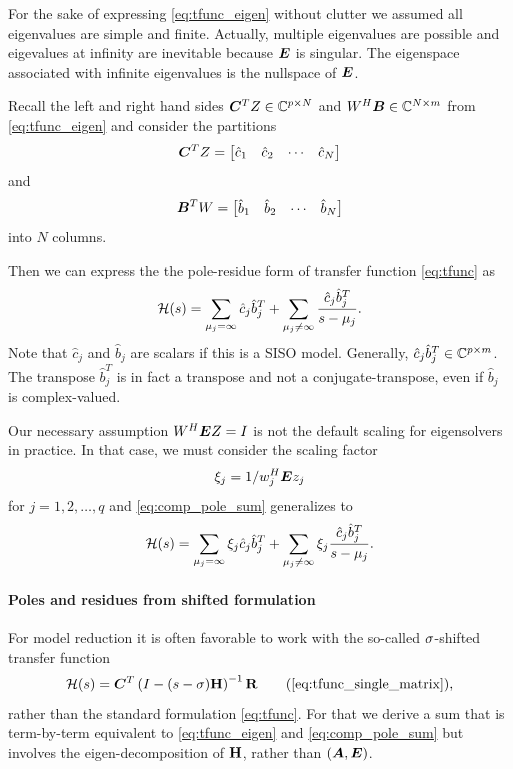 \bigskip 
For the sake of expressing \eqref{eq:tfunc_eigen} without clutter we assumed all eigenvalues are simple and finite.  Actually, multiple eigenvalues are possible and eigevalues at infinity are inevitable because $\bm{E}$ is singular.  The eigenspace associated with infinite eigenvalues is the nullspace of $\bm{E}$. 

Recall the left and right hand sides $\bm{C}^T Z\in \mathbb{C}^{p \times N}$ and $W^H \bm{B}\in \mathbb{C}^{N\times m}$ from \eqref{eq:tfunc_eigen} and consider the partitions 
\[
\bm{C}^T Z = \begin{bmatrix} \hat{c}_1 & \hat{c}_2 &\cdots&\hat{c}_N\end{bmatrix}
\]
and 
\[
\bm{B}^T W = \begin{bmatrix} \hat{b}_1 & \hat{b}_2 &\cdots&\hat{b}_N\end{bmatrix}
\]
into $N$ columns.

Then we can express the the pole-residue form of transfer function \eqref{eq:tfunc} as 
\begin{equation}
          \mathcal{H}(s)  =  \sum_{\mu_j=\infty} \hat{c}_j \hat{b}_j^T +
			   \sum_{\mu_j\neq\infty} \frac{\hat{c}_j \hat{b}_j^T}{s-\mu_j}\label{eq:comp_pole_sum}.
\end{equation}
Note that $\hat{c}_j$ and $\hat{b}_j$ are scalars if this is a SISO model. Generally, $\hat{c}_j \hat{b}_j^T\in\mathbb{C}^{p \times m}$.  The transpose $\hat{b}_j^T$ is in fact a transpose and not a conjugate-transpose, even if $\hat{b}_j$ is complex-valued.  
 

\smallskip
 Our necessary assumption  $W^H \bm{E} Z = I$ is not the default scaling for eigensolvers in practice.  In that case, we must consider the scaling factor
\[
\xi_j = 1 / w_j^H \bm{E} z_j
\]
for $j=1,2,\ldots,q$ and \eqref{eq:comp_pole_sum} generalizes to 
\begin{equation}
          \mathcal{H}(s)  =  \sum_{\mu_j=\infty} \xi_j\hat{c}_j \hat{b}_j^T +
			   \sum_{\mu_j\neq\infty} \xi_j\frac{\hat{c}_j \hat{b}_j^T}{s-\mu_j}\label{eq:comp_pole_sum_gen}.
\end{equation}

\paragraph{Poles and residues from shifted formulation}\label{sec:polewts_shifted}
For model reduction it is often favorable to work with the so-called $\sigma$-shifted transfer function 
\[
\tf(s) = \CC^T \left(I - (s-\xp)\H \right)^{-1} \RR \tag{\ref{eq:tfunc_single_matrix}},
\] 
rather than the standard formulation \eqref{eq:tfunc}.  For that we derive a sum that is term-by-term equivalent to  \eqref{eq:tfunc_eigen} and \eqref{eq:comp_pole_sum} but involves the eigen-decomposition of $\textbf{\textup{H}}$, rather than $(\bm{A},\bm{E})$.   

